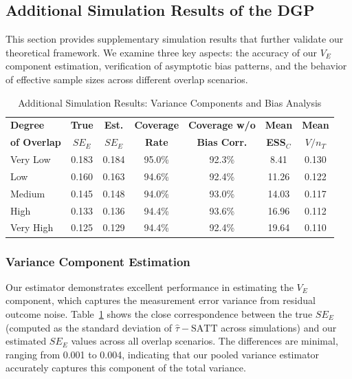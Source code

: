\documentclass{mytemplate}
\begin{document}
\subsection{Additional Simulation Results of the \cite{che2024caliper} DGP}
\label{sec:additional-simulation-results}

This section provides supplementary simulation results that further validate our theoretical framework. We examine three key aspects: the accuracy of our $V_E$ component estimation, verification of asymptotic bias patterns, and the behavior of effective sample sizes across different overlap scenarios.

\begin{table}[ht]
\centering
\caption{Additional Simulation Results: Variance Components and Bias Analysis}
\label{tab:additional-simulation-results}
\begin{tabular}{lcccccc}
\toprule
\textbf{Degree} & \textbf{True} & \textbf{Est.} & \textbf{Coverage} & \textbf{Coverage w/o} & \textbf{Mean} & \textbf{Mean} \\
\textbf{of Overlap} & $SE_E$ & $SE_E$ & \textbf{Rate} & \textbf{Bias Corr.} & \textbf{ESS}$_C$ & $V/n_T$ \\
\midrule
Very Low & 0.183 & 0.184 & 95.0\% & 92.3\% & 8.41 & 0.130 \\
Low & 0.160 & 0.163 & 94.6\% & 92.4\% & 11.26 & 0.122 \\
Medium & 0.145 & 0.148 & 94.0\% & 93.0\% & 14.03 & 0.117 \\
High & 0.133 & 0.136 & 94.4\% & 93.6\% & 16.96 & 0.112 \\
Very High & 0.125 & 0.129 & 94.4\% & 92.4\% & 19.64 & 0.110 \\
\bottomrule
\end{tabular}
\end{table}

\subsubsection{Variance Component Estimation}

Our estimator demonstrates excellent performance in estimating the $V_E$ component, which captures the measurement error variance from residual outcome noise. Table~\ref{tab:additional-simulation-results} shows the close correspondence between the true $SE_E$ (computed as the standard deviation of $\hat{\tau} - \text{SATT}$ across simulations) and our estimated $SE_E$ values across all overlap scenarios. The differences are minimal, ranging from 0.001 to 0.004, indicating that our pooled variance estimator accurately captures this component of the total variance.
\end{document}
